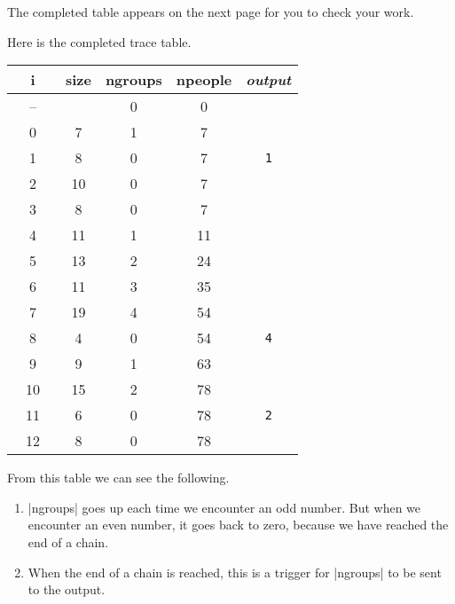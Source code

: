 The completed table appears on the next page for you to check your work.


\clearpage %

Here is the completed trace table.

\bigskip
\begin{center}
  \begin{tabular}{ccccc}
    \toprule
    ~~i~~ & size & ngroups & npeople & \emph{output} \\
    \midrule
    --    &      & 0       & 0       &               \\
    0     & 7    & 1       & 7       &               \\
    1     & 8    & 0       & 7       & \texttt{1}    \\
    2     & 10   & 0       & 7       &               \\
    3     & 8    & 0       & 7       &               \\
    4     & 11   & 1       & 11      &               \\
    5     & 13   & 2       & 24      &               \\
    6     & 11   & 3       & 35      &               \\
    7     & 19   & 4       & 54      &               \\
    8     & 4    & 0       & 54      & \texttt{4}    \\
    9     & 9    & 1       & 63      &               \\
    10    & 15   & 2       & 78      &               \\
    11    & 6    & 0       & 78      & \texttt{2}    \\
    12    & 8    & 0       & 78      &               \\
    \bottomrule
  \end{tabular}
\end{center}
\bigskip

From this table we can see the following.
\begin{enumerate}
  \item \pycode|ngroups| goes up each time we encounter an odd number. But when we
    encounter an even number, it goes back to zero, because we have reached the end of a
    chain.
  \item When the end of a chain is reached, this is a trigger for \pycode|ngroups| to be
    sent to the output.
\end{enumerate}

